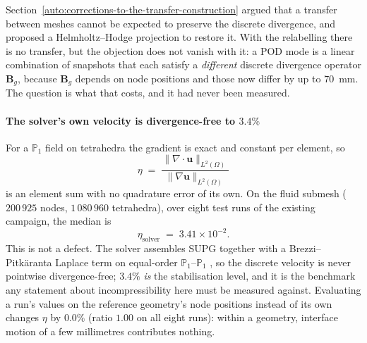 \documentclass[11pt,a4paper]{article}
\newcommand{\vect}[1]{\mathbf{#1}}
\theoremstyle{plain}
\theoremstyle{definition}
\theoremstyle{remark}
\begin{document}
Section~\ref{auto:corrections-to-the-transfer-construction} argued that a transfer between meshes cannot be expected to
preserve the discrete divergence, and proposed a Helmholtz--Hodge projection to
restore it. With the relabelling there is no transfer, but the objection does
not vanish with it: a POD mode is a linear combination of snapshots that each
satisfy a \emph{different} discrete divergence operator $\vect{B}_g$, because
$\vect{B}_g$ depends on node positions and those now differ by up to $70$~mm.
The question is what that costs, and it had never been measured.

\label{meas:eta-baseline}
\paragraph{The solver's own velocity is divergence-free to $3.4\%$}
For a $\mathbb{P}_1$ field on tetrahedra the gradient is exact and constant per
element, so
\[
  \eta \;=\; \frac{\|\nabla\cdot\vect{u}\|_{L^2(\Omega)}}
                  {\|\nabla\vect{u}\|_{L^2(\Omega)}}
\]
is an element sum with no quadrature error of its own. On the fluid submesh
($200\,925$ nodes, $1\,080\,960$ tetrahedra), over eight test runs of the
existing campaign, the median is
\[
  \eta_{\text{solver}} \;=\; 3.41\times10^{-2}.
\]
This is not a defect. The solver assembles SUPG together with a
Brezzi--Pitkäranta Laplace term on equal-order
$\mathbb{P}_1$--$\mathbb{P}_1$ \cite{hughes,brezzi-pitkaranta},
so the discrete velocity is never pointwise divergence-free; $3.4\%$ \emph{is}
the stabilisation level, and it is the benchmark any statement about
incompressibility here must be measured against. Evaluating a run's values on
the reference geometry's node positions instead of its own changes $\eta$ by
$0.0\%$ (ratio $1.00$ on all eight runs): within a geometry, interface motion of
a few millimetres contributes nothing.

\label{meas:eta-cross}
\end{document}
